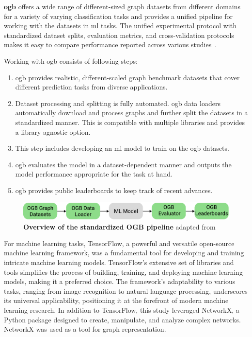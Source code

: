 \textbf{\Ac{ogb}} offers a wide range of different-sized graph datasets from different domains for a variety of varying classification tasks and provides a unified pipeline for working with the datasets in \ac{ml} tasks.
The unified experimental protocol with standardized dataset splits, evaluation metrics, and cross-validation protocols makes it easy to compare performance reported across various studies~\cite{Hu2020}.

Working with \ac{ogb} consists of following steps:

\begin{enumerate}
    \item \Ac{ogb} provides realistic, different-scaled graph benchmark datasets that cover different prediction tasks from diverse applications.
    \item Dataset processing and splitting is fully automated. \Ac{ogb} data loaders automatically download and process graphs and further split the datasets in a standardized manner. This is compatible with multiple libraries and provides a library-agnostic option.
    \item This step includes developing an \ac{ml} model to train on the \ac{ogb} datasets.
    \item  \Ac{ogb} evaluates the model in a dataset-dependent manner and outputs the model performance appropriate for the task at hand.
    \item \Ac{ogb} provides public leaderboards to keep track of recent advances.
\end{enumerate}

\begin{figure}[H]
    \centering
    \includegraphics[width= 0.90\linewidth]{gfx/implementation/OGB_pipeline}
    \caption{\textbf{Overview of the standardized OGB pipeline} adapted from \cite{Hu2020}}\label{fig:implement:pipeline}
\end{figure}


For machine learning tasks, TensorFlow, a powerful and versatile open-source machine learning framework, was a fundamental tool for developing and training intricate machine learning models.
TensorFlow's extensive set of libraries and tools simplifies the process of building, training, and deploying machine learning models, making it a preferred choice.
The framework's adaptability to various tasks, ranging from image recognition to natural language processing, underscores its universal applicability, positioning it at the forefront of modern machine learning research.
In addition to TensorFlow, this study leveraged NetworkX, a Python package designed to create, manipulate, and analyze complex networks. NetworkX was used as a tool for graph representation.
